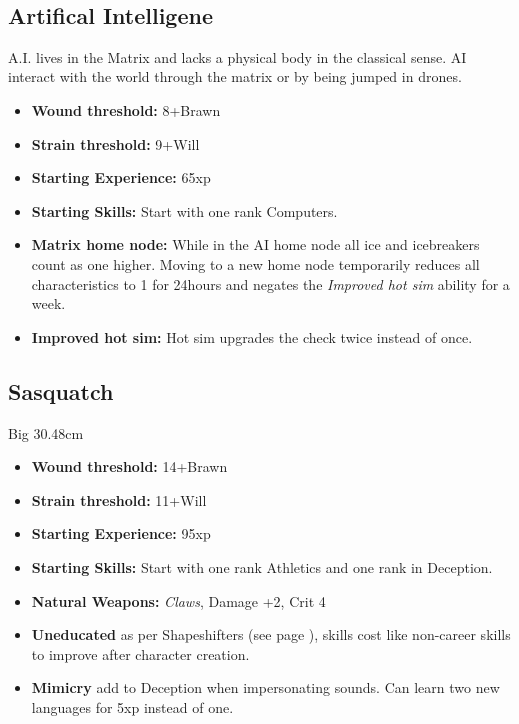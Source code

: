 \documentclass{book}
\begin{document}
\mbox{ }
\begin{multicols}{2}
	\subsection{Artifical Intelligene}
	A.I. lives in the Matrix and lacks a physical body in the classical sense. AI interact with the world through the matrix or by being jumped in drones.
	
	\begin{itemize}
		\item \textbf{Wound threshold:} 8+Brawn
		\item \textbf{Strain threshold:} 9+Will
		\item \textbf{Starting Experience:} 65xp
		\item \textbf{Starting Skills:} Start with one rank Computers.
		\item \textbf{Matrix home node:} While in the AI home node all ice and icebreakers count as one higher. Moving to a new home node temporarily reduces all characteristics to 1 for 24hours and negates the \textit{Improved hot sim} ability for a week.
		\item \textbf{Improved hot sim: } Hot sim upgrades the check twice instead of once. 
	\end{itemize}
	
	
	\subsection{Sasquatch}	
	Big 30.48cm
	
	\begin{itemize}
		\item \textbf{Wound threshold:} 14+Brawn
		\item \textbf{Strain threshold:} 11+Will
		\item \textbf{Starting Experience:} 95xp
		\item \textbf{Starting Skills:} Start with one rank Athletics and one rank in Deception.
		\item \textbf{Natural Weapons:} \textit{Claws}, Damage +2, Crit 4
		\item \textbf{Uneducated} as per Shapeshifters (see page \pageref{uneducated}), skills cost like non-career skills to improve after character creation.
		\item \textbf{Mimicry} add \BoostDie to Deception when impersonating sounds. Can learn two new languages for 5xp instead of one.
	\end{itemize}
\end{multicols}
\end{document}
